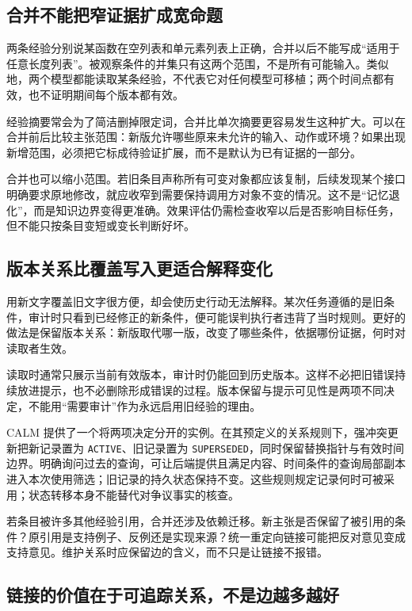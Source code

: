 \subsection{合并不能把窄证据扩成宽命题}

两条经验分别说某函数在空列表和单元素列表上正确，合并以后不能写成“适用于任意长度列表”。被观察条件的并集只有这两个范围，不是所有可能输入。类似地，两个模型都能读取某条经验，不代表它对任何模型可移植；两个时间点都有效，也不证明期间每个版本都有效。

经验摘要常会为了简洁删掉限定词，合并比单次摘要更容易发生这种扩大。可以在合并前后比较主张范围：新版允许哪些原来未允许的输入、动作或环境？如果出现新增范围，必须把它标成待验证扩展，而不是默认为已有证据的一部分。

合并也可以缩小范围。若旧条目声称所有可变对象都应该复制，后续发现某个接口明确要求原地修改，就应收窄到需要保持调用方对象不变的情况。这不是“记忆退化”，而是知识边界变得更准确。效果评估仍需检查收窄以后是否影响目标任务，但不能只按条目变短或变长判断好坏。

\subsection{版本关系比覆盖写入更适合解释变化}

用新文字覆盖旧文字很方便，却会使历史行动无法解释。某次任务遵循的是旧条件，审计时只看到已经修正的新条件，便可能误判执行者违背了当时规则。更好的做法是保留版本关系：新版取代哪一版，改变了哪些条件，依据哪份证据，何时对读取者生效。

读取时通常只展示当前有效版本，审计时仍能回到历史版本。这样不必把旧错误持续放进提示，也不必删除形成错误的过程。版本保留与提示可见性是两项不同决定，不能用“需要审计”作为永远启用旧经验的理由。

CALM 提供了一个将两项决定分开的实例。在其预定义的关系规则下，强冲突更新把新记录置为 \texttt{ACTIVE}、旧记录置为 \texttt{SUPERSEDED}，同时保留替换指针与有效时间边界\cite{calm-2610}。明确询问过去的查询，可让后端提供且满足内容、时间条件的查询局部副本进入本次使用筛选；旧记录的持久状态保持不变\cite{calm-2610}。这些规则规定记录何时可被采用；状态转移本身不能替代对争议事实的核查。

若条目被许多其他经验引用，合并还涉及依赖迁移。新主张是否保留了被引用的条件？原引用是支持例子、反例还是实现来源？统一重定向链接可能把反对意见变成支持意见。维护关系时应保留边的含义，而不只是让链接不报错。

\subsection{链接的价值在于可追踪关系，不是边越多越好}

